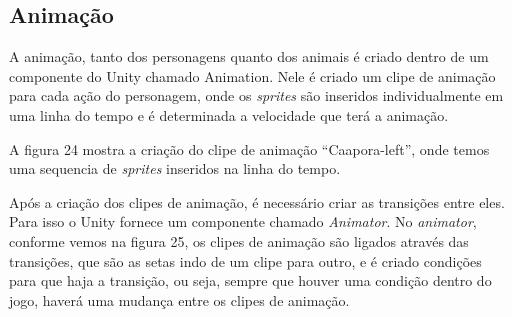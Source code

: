 \subsection{Animação}
A animação, tanto dos personagens quanto dos animais é criado dentro de um componente do Unity chamado Animation. Nele é criado um clipe de animação para cada ação do personagem, onde os \textit{sprites} são inseridos individualmente em uma linha do tempo e é determinada a velocidade que terá a animação.

A figura 24 mostra a criação do clipe de animação “Caapora-left”, onde temos uma sequencia de \textit{sprites} inseridos na linha do tempo.

\begin{figure}[h!]
		\centering
	\end{figure}


Após a criação dos clipes de animação, é necessário criar as transições entre eles. Para isso o Unity fornece um componente chamado \textit{Animator}. No \textit{animator}, conforme vemos na figura 25, os clipes de animação são ligados através das transições, que são as setas indo de um clipe para outro, e é criado condições para que haja a transição, ou seja, sempre que houver uma condição dentro do jogo, haverá uma mudança entre os clipes de animação.
	
\pagebreak

\begin{figure}[h!]
		\centering
	\end{figure}


